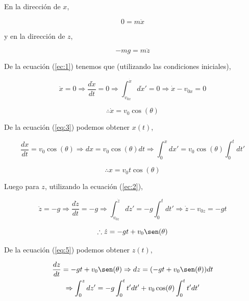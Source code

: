 \documentclass[a4paper,10pt]{article}
\begin{document}
\vspace{.3cm}

En la dirección de $x$,

\begin{equation}
 0 = m \ddot{x}
 \label{ec:1}
\end{equation}

y en la dirección de $z$,

\begin{equation}
 - mg = m \ddot{z}
  \label{ec:2}
\end{equation}

De la ecuación (\ref{ec:1}) tenemos que (utilizando las condiciones iniciales),

\begin{equation*}
 \ddot{x} = 0 \Rightarrow \frac{d\dot{x}}{dt} = 0 \Rightarrow 
 \int_{v_{0x}}^{\dot{x}}d\dot{x}' = 0 \Rightarrow \dot{x} - v_{0x} = 0 
 \end{equation*}

\begin{equation}
 \therefore \dot{x} = v_0 \cos(\theta)
 \label{eq:3}
\end{equation}

De la ecuación (\ref{eq:3}) podemos obtener $x(t)$, 

\begin{equation*}
 \frac{dx}{dt} = v_0 \cos(\theta) \Rightarrow dx = v_0 \cos(\theta) dt \Rightarrow
 \int_0^x dx' = v_0 \cos(\theta) \int_0^t dt'
\end{equation*}

\begin{equation}
 \therefore x = v_0 t \cos(\theta)
 \label{eq:4}
\end{equation}

Luego para $z$, utilizando la ecuación (\ref{ec:2}),

\begin{equation*}
 \ddot{z} = -g \Rightarrow \frac{d\dot{z}}{dt} = -g \Rightarrow 
 \int_{v_{0z}}^{\dot{z}}d\dot{z}' = -g \int_0^t dt' \Rightarrow \dot{z} - v_{0z} = -gt 
 \end{equation*}
 
\begin{equation}
 \therefore \dot{z} = -gt + v_0 \sen(\theta)
 \label{eq:5}
\end{equation}

De la ecuación (\ref{eq:5}) podemos obtener $z(t)$,

\begin{gather*}
 \frac{dz}{dt} = -gt + v_0 \sen(\theta) \Rightarrow dz = (-gt + v_0 \sen(\theta)) dt \\ \Rightarrow
 \int_0^z dz' = -g\int_0^t t' dt' + v_0 \cos(\theta) \int_0^t t'dt'
\end{gather*}
\end{document}
